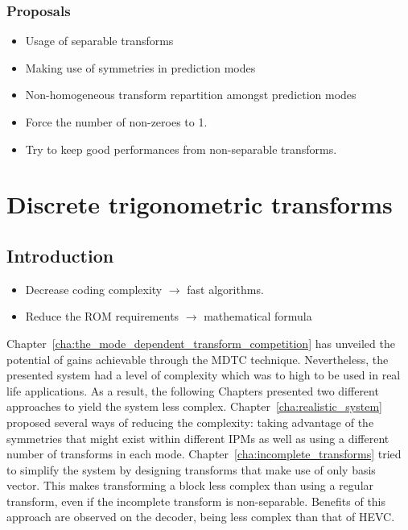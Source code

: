\documentclass[11pt,a4paper,openright,twoside]{book}
\numberwithin{equation}{section} %
\numberwithin{figure}{section} %
\numberwithin{table}{section} %
\begin{document}
\subsection{Proposals}
\label{sub:proposals}

\begin{itemize}
	\item Usage of separable transforms
	\item Making use of symmetries in prediction modes
	\item Non-homogeneous transform repartition amongst prediction modes
\end{itemize}

\begin{itemize}
	\item Force the number of non-zeroes to 1.
	\item Try to keep good performances from non-separable transforms.
\end{itemize}

\chapter{Discrete trigonometric transforms}
\label{cha:discrete_trigonometric_transforms}

\section{Introduction}
\label{sec:introduction}

\begin{itemize}
	\item Decrease coding complexity $\rightarrow$ fast algorithms.
	\item Reduce the ROM requirements $\rightarrow$ mathematical formula
\end{itemize}

Chapter~\ref{cha:the_mode_dependent_transform_competition} has unveiled the
potential of gains achievable through the \ac{MDTC} technique.
Nevertheless, the presented system had a level of complexity which was to
high to be used in real life applications.
As a result, the following Chapters presented two different approaches to
yield the system less complex.
Chapter~\ref{cha:realistic_system} proposed several ways of reducing the
complexity: taking advantage of the symmetries that might exist within
different \acp{IPM} as well as using a different number of transforms in each
mode.
Chapter~\ref{cha:incomplete_transforms} tried to simplify the system by
designing transforms that make use of only basis vector.
This makes transforming a block less complex than using a regular transform,
even if the incomplete transform is non-separable.
Benefits of this approach are observed on the decoder, being less complex than
that of \ac{HEVC}.
\end{document}

